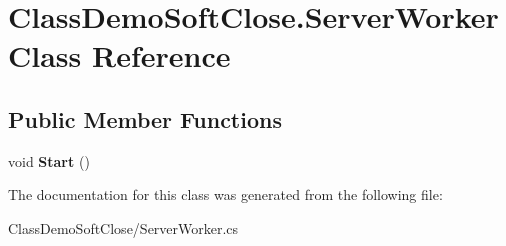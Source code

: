 \hypertarget{class_class_demo_soft_close_1_1_server_worker}{}\section{Class\+Demo\+Soft\+Close.\+Server\+Worker Class Reference}
\label{class_class_demo_soft_close_1_1_server_worker}
\subsection*{Public Member Functions}
\begin{DoxyCompactItemize}
\item 
\mbox{\label{class_class_demo_soft_close_1_1_server_worker_a91f56abedb5499baf61e558f5fdb7285}} 
void {\bfseries Start} ()
\end{DoxyCompactItemize}


The documentation for this class was generated from the following file\+:\begin{DoxyCompactItemize}
\item 
Class\+Demo\+Soft\+Close/Server\+Worker.\+cs\end{DoxyCompactItemize}
